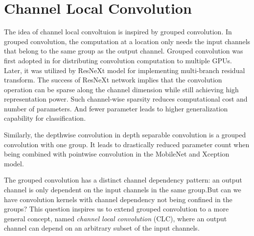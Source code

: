 \documentclass[10pt,twocolumn,letterpaper]{article}
\begin{document}

\section{Channel Local Convolution}

The idea of channel local convoltuion is inspired by grouped convolution. In grouped convolution, the computation at a location only needs the input channels that belong to the same group as the output channel. Grouped convolution was first adopted in \cite{alexnet2012krizhevsky} for distributing convolution computation to multiple GPUs.  Later, it was utilized by ResNeXt\cite{resnext2016saining} model for implementing multi-branch residual transform. The success of ResNeXt network implies that the convolution operation can be sparse along the channel dimension while still achieving high representation power. Such channel-wise sparsity reduces computational cost and number of parameters. And fewer parameter leads to higher generalization capability for classification. 

Similarly, the depthwise convolution in depth separable convolution is a grouped convolution with one group. It leads to drastically reduced parameter count when being combined with pointwise convolution in the MobileNet\cite{mobilenet2017howard} and Xception\cite{xception2017chollet} model.

The grouped convolution has a distinct channel dependency pattern: an output channel is only dependent on the input channels in the same group.But can we have convolution kernels with channel dependency not being confined in the groups? This question inspires us to extend grouped convolution to a more general concept, named \textit{channel local convolution} (CLC), where an output channel can depend on an arbitrary subset of the input channels. 
\end{document}
